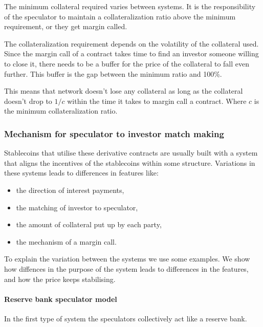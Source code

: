 \documentclass[english,]{IEEEtran}
\providecommand{\tightlist}{%
  \setlength{\itemsep}{0pt}\setlength{\parskip}{0pt}}
\let\oldparagraph\paragraph
\renewcommand{\paragraph}[1]{\oldparagraph{#1}\mbox{}}
\begin{document}
The minimum collateral required varies between systems. It is the
responsibility of the speculator to maintain a collateralization ratio
above the minimum requirement, or they get margin called.

The collateralization requirement depends on the volatility of the
collateral used. Since the margin call of a contract takes time to find
an investor someone willing to close it, there needs to be a buffer for
the price of the collateral to fall even further. This buffer is the gap
between the minimum ratio and 100\%.

This means that network doesn't lose any collateral as long as the
collateral doesn't drop to \(1/c\) within the time it takes to margin
call a contract. Where \(c\) is the minimum collateralization ratio.

\hypertarget{mechanism-for-speculator-to-investor-match-making}{%
\subsubsection{Mechanism for speculator to investor match
making}\label{mechanism-for-speculator-to-investor-match-making}}

Stablecoins that utilise these derivative contracts are usually built
with a system that aligns the incentives of the stablecoins within some
structure. Variations in these systems leads to differences in features
like:

\begin{itemize}
\tightlist
\item
  the direction of interest payments,
\item
  the matching of investor to speculator,
\item
  the amount of collateral put up by each party,
\item
  the mechanism of a margin call.
\end{itemize}

To explain the variation between the systems we use some examples. We
show how diffences in the purpose of the system leads to differences in
the features, and how the price keeps stabilising.

\hypertarget{reserve-bank-speculator-model}{%
\paragraph{Reserve bank speculator
model}\label{reserve-bank-speculator-model}}

In the first type of system the speculators collectively act like a
reserve bank.
\end{document}
